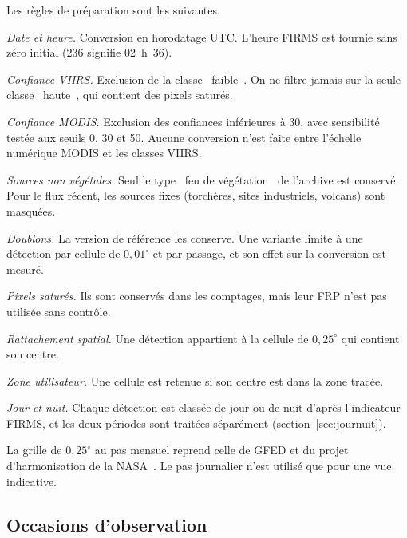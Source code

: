 \documentclass[11pt,a4paper]{article}
\newcommand{\og}{\guillemotleft~}
\newcommand{\fg}{~\guillemotright}
\begin{document}
Les règles de préparation sont les suivantes.
\begin{description}[leftmargin=0.9cm,style=sameline,font=\normalfont\bfseries]
  \item[P1] \emph{Date et heure.} Conversion en horodatage UTC. L'heure FIRMS est fournie sans zéro initial (236 signifie 02~h~36).
  \item[P2] \emph{Confiance VIIRS.} Exclusion de la classe \og faible\fg. On ne filtre jamais sur la seule classe \og haute\fg, qui contient des pixels saturés.
  \item[P3] \emph{Confiance MODIS.} Exclusion des confiances inférieures à 30, avec sensibilité testée aux seuils 0, 30 et 50. Aucune conversion n'est faite entre l'échelle numérique MODIS et les classes VIIRS.
  \item[P4] \emph{Sources non végétales.} Seul le type \og feu de végétation\fg{} de l'archive est conservé. Pour le flux récent, les sources fixes (torchères, sites industriels, volcans) sont masquées.
  \item[P5] \emph{Doublons.} La version de référence les conserve. Une variante limite à une détection par cellule de $0{,}01^\circ$ et par passage, et son effet sur la conversion est mesuré.
  \item[P6] \emph{Pixels saturés.} Ils sont conservés dans les comptages, mais leur FRP n'est pas utilisée sans contrôle.
  \item[P7] \emph{Rattachement spatial.} Une détection appartient à la cellule de $0{,}25^\circ$ qui contient son centre.
  \item[P8] \emph{Zone utilisateur.} Une cellule est retenue si son centre est dans la zone tracée.
  \item[P9] \emph{Jour et nuit.} Chaque détection est classée de jour ou de nuit d'après l'indicateur FIRMS, et les deux périodes sont traitées séparément (section~\ref{sec:journuit}).
\end{description}
La grille de $0{,}25^\circ$ au pas mensuel reprend celle de GFED et du projet d'harmonisation de la NASA~\cite{chen2023,boschetti2022}. Le pas journalier n'est utilisé que pour une vue indicative.

\subsection{Occasions d'observation}\label{sec:occasions}
\end{document}
